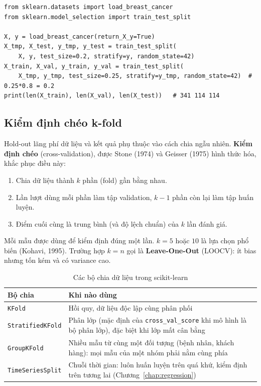 \begin{lstlisting}[caption={Chia dữ liệu ba phần}]
from sklearn.datasets import load_breast_cancer
from sklearn.model_selection import train_test_split

X, y = load_breast_cancer(return_X_y=True)
X_tmp, X_test, y_tmp, y_test = train_test_split(
    X, y, test_size=0.2, stratify=y, random_state=42)
X_train, X_val, y_train, y_val = train_test_split(
    X_tmp, y_tmp, test_size=0.25, stratify=y_tmp, random_state=42)  # 0.25*0.8 = 0.2
print(len(X_train), len(X_val), len(X_test))   # 341 114 114
\end{lstlisting}

\subsection{Kiểm định chéo k-fold}

Hold-out lãng phí dữ liệu và kết quả phụ thuộc vào cách chia ngẫu nhiên. \textbf{Kiểm định chéo} (cross-validation), được Stone (1974) và Geisser (1975) hình thức hóa, khắc phục điều này:
\begin{enumerate}
    \item Chia dữ liệu thành $k$ phần (fold) gần bằng nhau.
    \item Lần lượt dùng mỗi phần làm tập validation, $k - 1$ phần còn lại làm tập huấn luyện.
    \item Điểm cuối cùng là trung bình (và độ lệch chuẩn) của $k$ lần đánh giá.
\end{enumerate}
Mỗi mẫu được dùng để kiểm định đúng một lần. $k = 5$ hoặc $10$ là lựa chọn phổ biến (Kohavi, 1995). Trường hợp $k = n$ gọi là \textbf{Leave-One-Out} (LOOCV): ít bias nhưng tốn kém và có variance cao.


\begin{table}[H]
\centering
\begin{tabular}{|l|p{8.5cm}|}
\hline
\textbf{Bộ chia} & \textbf{Khi nào dùng} \\
\hline
\texttt{KFold} & Hồi quy, dữ liệu độc lập cùng phân phối \\ \hline
\texttt{StratifiedKFold} & Phân lớp (mặc định của \texttt{cross\_val\_score} khi mô hình là bộ phân lớp), đặc biệt khi lớp mất cân bằng \\ \hline
\texttt{GroupKFold} & Nhiều mẫu từ cùng một đối tượng (bệnh nhân, khách hàng): mọi mẫu của một nhóm phải nằm cùng phía \\ \hline
\texttt{TimeSeriesSplit} & Chuỗi thời gian: luôn huấn luyện trên quá khứ, kiểm định trên tương lai (Chương~\ref{chap:regression}) \\ \hline
\end{tabular}
\caption{Các bộ chia dữ liệu trong scikit-learn}
\end{table}

